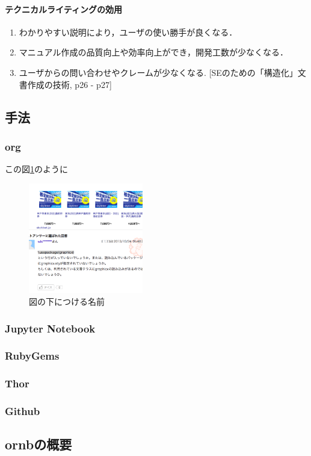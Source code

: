 \documentclass[11pt]{article}
\begin{document}
\paragraph{テクニカルライティングの効用}
\label{sec:org864c6fd}
\begin{enumerate}
\item わかりやすい説明により，ユーザの使い勝手が良くなる．
\item マニュアル作成の品質向上や効率向上ができ，開発工数が少なくなる．
\item ユーザからの問い合わせやクレームが少なくなる.
[SEのための「構造化」文書作成の技術, p26 - p27]
\end{enumerate}

\subsection{手法}
\label{sec:orgfd1967c}

\subsubsection{org}
\label{sec:org3f57bfc}

この図\ref{fig:orga757cce}のように

\begin{figure}[htbp]
\centering
\includegraphics[width=5cm]{./test2.png}
\caption{\label{fig:orga757cce}
図の下につける名前}
\end{figure}

\subsubsection{Jupyter Notebook}
\label{sec:orge2e897a}

\subsubsection{RubyGems}
\label{sec:orgd3974eb}

\subsubsection{Thor}
\label{sec:org4e58ec6}

\subsubsection{Github}
\label{sec:org6542729}

\subsection{ornbの概要}
\label{sec:orgf828505}
\end{document}
